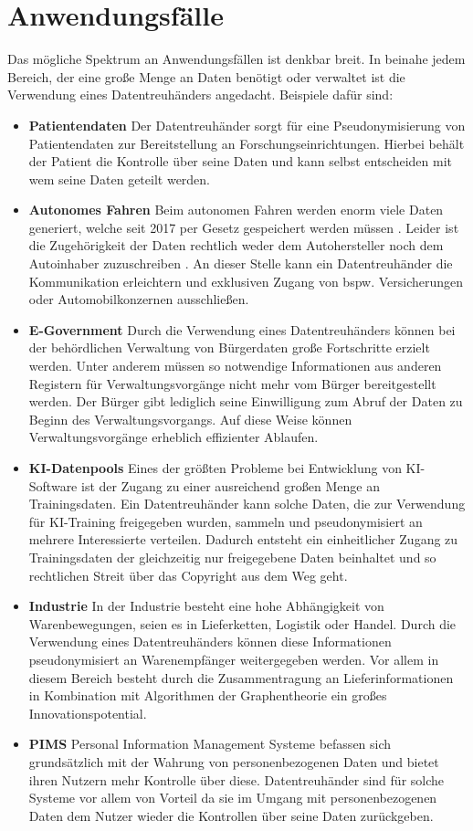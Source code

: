 \documentclass[11pt,a4paper]{scrreprt}
\begin{document}
\section{Anwendungsfälle}
\label{sec:dt-usecases}
Das mögliche Spektrum an Anwendungsfällen ist denkbar breit. In beinahe jedem Bereich, der eine große Menge an Daten benötigt oder verwaltet ist die Verwendung eines Datentreuhänders angedacht. Beispiele dafür sind:
\begin{itemize}
    \item \textbf{Patientendaten} Der Datentreuhänder sorgt für eine Pseudonymisierung von Patientendaten zur Bereitstellung an Forschungseinrichtungen. Hierbei behält der Patient die Kontrolle über seine Daten und kann selbst entscheiden mit wem seine Daten geteilt werden.
    \item \textbf{Autonomes Fahren} Beim autonomen Fahren werden enorm viele Daten generiert, welche seit 2017 per Gesetz gespeichert werden müssen \cite{dt-bundesdruckereiDatentreuhänder}. Leider ist die Zugehörigkeit der Daten rechtlich weder dem Autohersteller noch dem Autoinhaber zuzuschreiben \cite{dt-richter2020ddvtalk}. An dieser Stelle kann ein Datentreuhänder die Kommunikation erleichtern und exklusiven Zugang von bspw. Versicherungen oder Automobilkonzernen ausschließen.
    \item \textbf{E-Government} Durch die Verwendung eines Datentreuhänders können bei der behördlichen Verwaltung von Bürgerdaten große Fortschritte erzielt werden. Unter anderem müssen so notwendige Informationen aus anderen Registern für Verwaltungsvorgänge nicht mehr vom Bürger bereitgestellt werden. Der Bürger gibt lediglich seine Einwilligung zum Abruf der Daten zu Beginn des Verwaltungsvorgangs. Auf diese Weise können Verwaltungsvorgänge erheblich effizienter Ablaufen.
    \item \textbf{KI-Datenpools} Eines der größten Probleme bei Entwicklung von KI-Software ist der Zugang zu einer ausreichend großen Menge an Trainingsdaten. Ein Datentreuhänder kann solche Daten, die zur Verwendung für KI-Training freigegeben wurden, sammeln und pseudonymisiert an mehrere Interessierte verteilen. Dadurch entsteht ein einheitlicher Zugang zu Trainingsdaten der gleichzeitig nur freigegebene Daten beinhaltet und so rechtlichen Streit über das Copyright aus dem Weg geht.
    \item \textbf{Industrie} In der Industrie besteht eine hohe Abhängigkeit von Warenbewegungen, seien es in Lieferketten, Logistik oder Handel. Durch die Verwendung eines Datentreuhänders können diese Informationen pseudonymisiert an Warenempfänger weitergegeben werden. Vor allem in diesem Bereich besteht durch die Zusammentragung an Lieferinformationen in Kombination mit Algorithmen der Graphentheorie ein großes Innovationspotential.
    \item \textbf{PIMS} Personal Information Management Systeme befassen sich grundsätzlich mit der Wahrung von personenbezogenen Daten und bietet ihren Nutzern mehr Kontrolle über diese.  Datentreuhänder sind für solche Systeme vor allem von Vorteil da sie im Umgang mit personenbezogenen Daten dem Nutzer wieder die Kontrollen über seine Daten zurückgeben.
\end{itemize}
\end{document}
